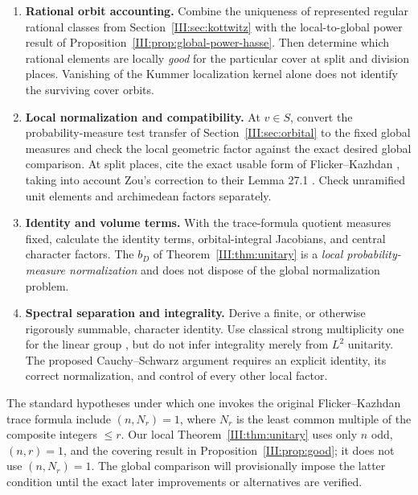 \begin{enumerate}[label=(\arabic*)]
\item \textbf{Rational orbit accounting.} Combine the uniqueness of represented regular rational classes from
Section~\ref{III:sec:kottwitz} with the local-to-global power result
of Proposition~\ref{III:prop:global-power-hasse}. Then determine which
rational elements are locally \emph{good} for the particular
cover at split and division places. Vanishing of the Kummer
localization kernel alone does not identify the surviving cover orbits.
\item \textbf{Local normalization and compatibility.} At $v\in S$, convert the probability-measure test transfer of Section~\ref{III:sec:orbital} to the fixed global measures and check the local geometric factor against the exact desired global comparison. At split places, cite the exact usable form of Flicker--Kazhdan \cite{FK86}, taking into account Zou's correction to their Lemma 27.1 \cite{Zo23}. Check unramified unit elements and archimedean factors separately.
\item \textbf{Identity and volume terms.} With the trace-formula quotient measures fixed, calculate the identity terms, orbital-integral Jacobians, and central character factors. The $b_D$ of Theorem~\ref{III:thm:unitary} is a \emph{local probability-measure normalization} and does not dispose of the global normalization problem.
\item \textbf{Spectral separation and integrality.} Derive a finite, or otherwise rigorously summable, character identity. Use classical strong multiplicity one for the linear group \cite{Bad08}, but do not infer integrality merely from $L^2$ unitarity. The proposed Cauchy--Schwarz argument requires an explicit identity, its correct normalization, and control of every other local factor.
\end{enumerate}

\begin{remark}[Restriction on $n$]\label{III:rem:N}
The standard hypotheses under which one invokes the original Flicker--Kazhdan trace formula include $(n,N_r)=1$, where $N_r$ is the least common multiple of the composite integers $\le r$. Our local Theorem~\ref{III:thm:unitary} uses only $n$ odd, $(n,r)=1$, and the covering result in Proposition~\ref{III:prop:good}; it does not use $(n,N_r)=1$. The global comparison will provisionally impose the latter condition until the exact later improvements or alternatives are verified.
\end{remark}

